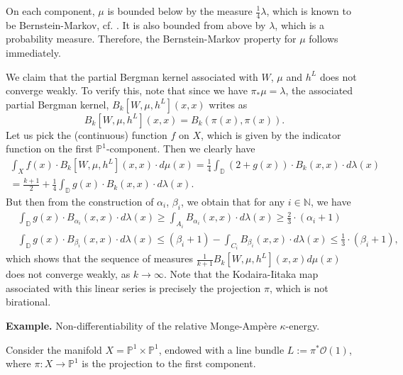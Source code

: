 \documentclass[12pt]{article}
\numberwithin{equation}{section}
\theoremstyle{theorem}
\theoremstyle{definition}
\theoremstyle{remark}
\newcommand{\nat}{\mathbb{N}}
\begin{document}
	On each component, $\mu$ is bounded below by the measure $\frac{1}{4} \lambda$, which is known to be Bernstein-Markov, cf. \cite{KlimekBook}. 
	It is also bounded from above by $\lambda$, which is a probability measure.
	Therefore, the Bernstein-Markov property for $\mu$ follows immediately.
	\par 
	We claim that the partial Bergman kernel associated with $W$, $\mu$ and $h^L$ does not converge weakly.
	To verify this, note that since we have $\pi_* \mu = \lambda$, the associated partial Bergman kernel, $B_k[W, \mu, h^L](x, x)$ writes as 
	\begin{equation}\label{eq_part_berg_expl_cal}
		B_k[W, \mu, h^L](x, x)
		=
		B_k(\pi(x), \pi(x)).
	\end{equation}
	Let us pick the (continuous) function $f$ on $X$, which is given by the indicator function on the first $\mathbb{P}^1$-component.
	Then we clearly have
	\begin{multline}
		\int_X f(x) \cdot B_k[W, \mu, h^L](x, x) \cdot d \mu(x)
		=
		\frac{1}{4}
		\int_{\mathbb{D}} (2 + g(x)) \cdot B_k(x, x) \cdot d \lambda(x)
		\\
		=
		\frac{k + 1}{2}
		+
		\frac{1}{4}
		\int_{\mathbb{D}} g(x) \cdot B_k(x, x) \cdot d \lambda(x).
	\end{multline}
	But then from the construction of $\alpha_i$, $\beta_i$, we obtain that for any $i \in \nat$, we have
	\begin{equation}
	\begin{aligned}
		&
		\int_{\mathbb{D}} g(x) \cdot B_{\alpha_i}(x, x) \cdot d \lambda(x)
		\geq
		\int_{A_i} B_{\alpha_i}(x, x) \cdot d \lambda(x)
		\geq
		\frac{2}{3} \cdot (\alpha_i + 1)
		\\
		&
		\int_{\mathbb{D}} g(x) \cdot B_{\beta_i}(x, x) \cdot d \lambda(x)
		\leq
		(\beta_i + 1) - \int_{C_i} B_{\beta_i}(x, x) \cdot d \lambda(x)
		\leq
		\frac{1}{3} \cdot (\beta_i + 1),
	\end{aligned}
	\end{equation}
	which shows that the sequence of measures $\frac{1}{k + 1} B_k[W, \mu, h^L](x, x) d \mu(x)$ does not converge weakly, as $k \to \infty$.
	Note that the Kodaira-Iitaka map associated with this linear series is precisely the projection $\pi$, which is not birational.
	\par 
	\textbf{Example.} Non-differentiability of the relative Monge-Ampère $\kappa$-energy.
	\par
	Consider the manifold $X = \mathbb{P}^1 \times \mathbb{P}^1$, endowed with a line bundle $L := \pi^* \mathscr{O}(1)$, where $\pi : X \to \mathbb{P}^1$ is the projection to the first component.
\end{document}
